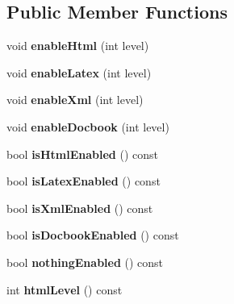 \subsection*{Public Member Functions}
\begin{DoxyCompactItemize}
\item 
\mbox{\label{class_local_toc_adb0a6e17eee8f7d80a9aadda144adeef}} 
void {\bfseries enable\+Html} (int level)
\item 
\mbox{\label{class_local_toc_a66f3b736634b3db5aa9a62942917e5a5}} 
void {\bfseries enable\+Latex} (int level)
\item 
\mbox{\label{class_local_toc_a133dfb0a71ebad467f3dda6007ffbcc2}} 
void {\bfseries enable\+Xml} (int level)
\item 
\mbox{\label{class_local_toc_a9f4ccaf943151b3748ac55d7c5ec1095}} 
void {\bfseries enable\+Docbook} (int level)
\item 
\mbox{\label{class_local_toc_a07b1cd7e11164849f2de2a568cd584eb}} 
bool {\bfseries is\+Html\+Enabled} () const
\item 
\mbox{\label{class_local_toc_af62a2335cca0b04ddbda5cc57e59bd19}} 
bool {\bfseries is\+Latex\+Enabled} () const
\item 
\mbox{\label{class_local_toc_a3c3e72b9a062560ca3e5b9cee2cbe3c4}} 
bool {\bfseries is\+Xml\+Enabled} () const
\item 
\mbox{\label{class_local_toc_aef79ee9848fb8c2d09ed0e8ab101fc5c}} 
bool {\bfseries is\+Docbook\+Enabled} () const
\item 
\mbox{\label{class_local_toc_ae15aacdbfdb4b902b85e8ba116f7f468}} 
bool {\bfseries nothing\+Enabled} () const
\item 
\mbox{\label{class_local_toc_a8cdc5e389caf05398964aded60de1ff0}} 
int {\bfseries html\+Level} () const
\item 
\mbox{\label{class_local_toc_a6de83921649038414bd0d40104245e19}} 

\end{DoxyCompactItemize}
